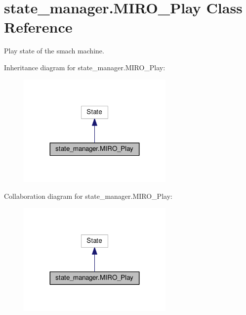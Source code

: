 \hypertarget{classstate__manager_1_1MIRO__Play}{}\section{state\+\_\+manager.\+M\+I\+R\+O\+\_\+\+Play Class Reference}
\label{classstate__manager_1_1MIRO__Play}


Play state of the smach machine.  




Inheritance diagram for state\+\_\+manager.\+M\+I\+R\+O\+\_\+\+Play\+:\nopagebreak
\begin{figure}[H]
\begin{center}
\leavevmode
\includegraphics[width=215pt]{classstate__manager_1_1MIRO__Play__inherit__graph}
\end{center}
\end{figure}


Collaboration diagram for state\+\_\+manager.\+M\+I\+R\+O\+\_\+\+Play\+:\nopagebreak
\begin{figure}[H]
\begin{center}
\leavevmode
\includegraphics[width=215pt]{classstate__manager_1_1MIRO__Play__coll__graph}
\end{center}
\end{figure}
